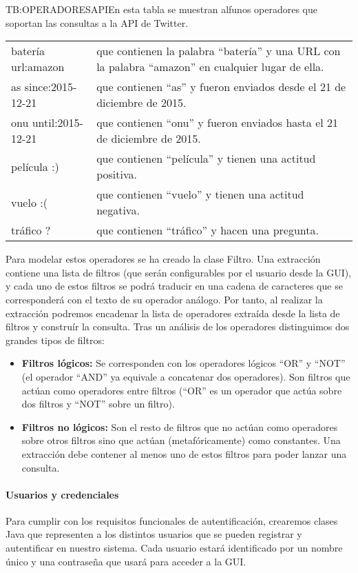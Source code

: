 \begin{table}[Operadores de Twitter API]{TB:OPERADORESAPI}{En esta tabla se muestran alfunos operadores que soportan las consultas a la API de Twitter.}
\begin{tabular}{|p{3.5cm}|p{11.5cm}|}
batería url:amazon & que contienen la palabra ``batería'' y una URL con la palabra ``amazon'' en cualquier lugar de ella.\\
as since:2015-12-21 & que contienen ``as'' y fueron enviados desde el 21 de diciembre de 2015.\\
onu until:2015-12-21 & que contienen ``onu'' y fueron enviados hasta el 21 de diciembre de 2015.\\
película :) & que contienen ``película'' y tienen una actitud positiva.\\
vuelo :( & que contienen ``vuelo'' y tienen una actitud negativa.\\
tráfico ? & que contienen ``tráfico'' y hacen una pregunta. \\
\hline
\end{tabular}
\end{table}

Para modelar estos operadores se ha creado la clase Filtro. Una extracción contiene una lista de filtros (que serán configurables por el usuario desde la GUI), y cada uno de estos filtros se podrá traducir en una cadena de caracteres que se corresponderá con el texto de su operador análogo.
Por tanto, al realizar la extracción podremos encadenar la lista de operadores extraída desde la lista de filtros y construír la consulta. 
Tras un análisis de los operadores distinguimos dos grandes tipos de filtros:
\begin{itemize}
\item \textbf{Filtros lógicos:} Se corresponden con los operadores lógicos ``OR'' y ``NOT'' (el operador ``AND'' ya equivale a concatenar dos operadores). Son filtros que actúan como operadores entre filtros (``OR'' es un operador que actúa sobre dos filtros y ``NOT'' sobre un filtro).
\item\textbf{Filtros no lógicos:} Son el resto de filtros que no actúan como operadores sobre otros filtros sino que actúan (metafóricamente) como constantes. Una extracción debe contener al menos uno de estos filtros para poder lanzar una consulta. 
\end{itemize}
\paragraph{Usuarios y credenciales}
Para cumplir con los requisitos funcionales de autentificación, crearemos clases Java que representen a los distintos usuarios que se pueden registrar y autentificar en nuestro sistema. Cada usuario estará identificado por un nombre único y una contraseña que usará para acceder a la GUI.
